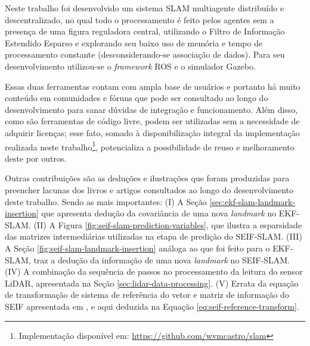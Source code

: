 Neste trabalho foi desenvolvido um sistema SLAM multiagente distribuído e 
descentralizado, no qual todo o processamento é feito pelos agentes sem a presença de uma figura reguladora central, utilizando o Filtro de Informação Estendido Esparso e explorando seu baixo uso de memória e tempo de processamento constante (desconsiderando-se associação de dados). Para seu desenvolvimento utilizou-se o \textit{framework} ROS e o 
simulador Gazebo.

Essas duas ferramentas contam com ampla base de usuários e portanto há 
muito conteúdo em comunidades e fóruns que pode ser consultado ao longo 
do desenvolvimento para sanar dúvidas de integração e funcionamento. 
Além disso, como são ferramentas de código livre, podem ser utilizadas 
sem a necessidade de adquirir licenças; esse fato, somado à 
disponibilização integral da implementação realizada neste trabalho\footnote{Implementação disponível em: \url{https://github.com/wvmcastro/slam}}, potencializa a 
possibilidade de reuso e melhoramento deste por outros. 

Outras contribuições são as deduções e ilustrações que 
foram produzidas para preencher lacunas dos livros e artigos 
consultados ao longo do desenvolvimento deste trabalho. Sendo as mais importantes: (I) A 
Seção \ref{sec:ekf-slam-landmark-insertion} que apresenta dedução da 
covariância de uma nova \textit{landmark} no EKF-SLAM. (II) A Figura 
\ref{fig:seif-slam-prediction-variables}, que ilustra a esparsidade das 
matrizes intermediárias utilizadas na etapa de predição do SEIF-SLAM. 
(III) A Seção \ref{fig:seif-slam-landmark-insertion} análoga ao que 
foi feito para o EKF-SLAM, traz a dedução da informação de uma nova 
\textit{landmark} no SEIF-SLAM. (IV) A combinação da sequência de passos 
no processamento da leitura do sensor LiDAR, apresentada na Seção \ref{sec:lidar-data-processing}. (V) Errata da equação de transformação de 
sistema de referência do vetor e matriz de informação do SEIF 
apresentada em \cite[Seção.~12.11.2]{thrun2005probabilistic}, e aqui 
deduzida na Equação \ref{eq:seif-reference-transform}.


